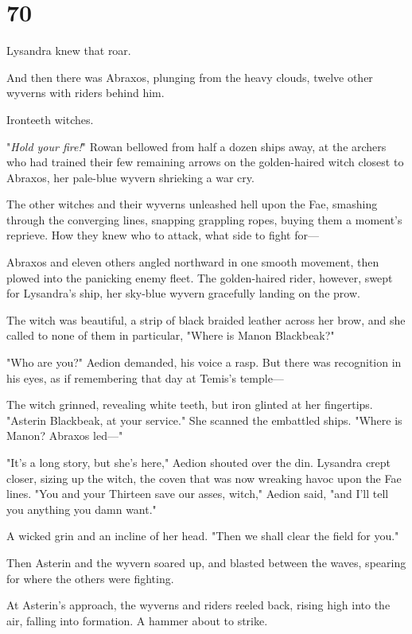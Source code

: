 
\chapter{70}

Lysandra knew that roar.

And then there was Abraxos, plunging from the heavy clouds, twelve other wyverns with riders behind him.

Ironteeth witches.

"\emph{Hold your fire!}" Rowan bellowed from half a dozen ships away, at the archers who had trained their few remaining arrows on the golden-haired witch closest to Abraxos, her pale-blue wyvern shrieking a war cry.

The other witches and their wyverns unleashed hell upon the Fae, smashing through the converging lines, snapping grappling ropes, buying them a moment's reprieve. How they knew who to attack, what side to fight for---

Abraxos and eleven others angled northward in one smooth movement, then plowed into the panicking enemy fleet. The golden-haired rider, however, swept for Lysandra's ship, her sky-blue wyvern gracefully landing on the prow.

The witch was beautiful, a strip of black braided leather across her brow, and she called to none of them in particular, "Where is Manon Blackbeak?"

"Who are you?" Aedion demanded, his voice a rasp. But there was recognition in his eyes, as if remembering that day at Temis's temple---

The witch grinned, revealing white teeth, but iron glinted at her fingertips. "Asterin Blackbeak, at your service." She scanned the embattled ships. "Where is Manon? Abraxos led---"

"It's a long story, but she's here," Aedion shouted over the din. Lysandra crept closer, sizing up the witch, the coven that was now wreaking havoc upon the Fae lines. "You and your Thirteen save our asses, witch," Aedion said, "and I'll tell you anything you damn want."

A wicked grin and an incline of her head. "Then we shall clear the field for you."

Then Asterin and the wyvern soared up, and blasted between the waves, spearing for where the others were fighting.

At Asterin's approach, the wyverns and riders reeled back, rising high into the air, falling into formation. A hammer about to strike.

